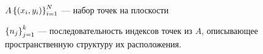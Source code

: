 






 $A \left\{\left(x_i, y_i\right)\right\}_{i=1}^N$ --- набор точек на плоскости

 $\left\{n_j\right\}_{j=1}^k$ --- последовательность индексов точек из $A$, описывающее пространственную структуру их расположения.



